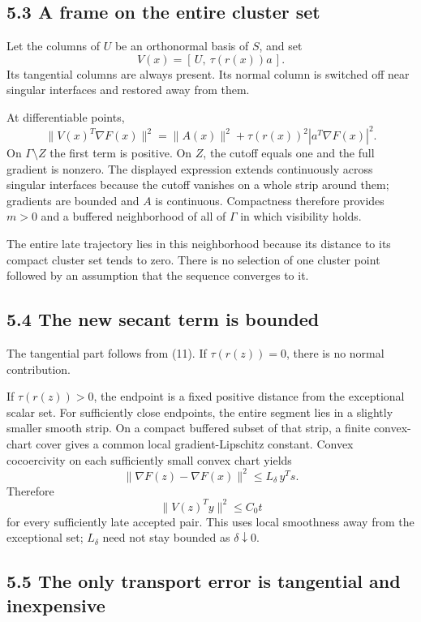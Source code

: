 \documentclass[10pt,oneside,openany]{book}
\theoremstyle{remark}\newtheorem{remark}{Remark}[chapter]
\begin{document}
\subsection{5.3 A frame on the entire cluster
set}\label{U:a-frame-on-the-entire-cluster-set}

Let the columns of \(U\) be an orthonormal basis of \(S\), and set \[
 \boxed{V(x)=[\,U,\ \tau(r(x))a\,].}\tag{U.12}
\] Its tangential columns are always present. Its normal column is
switched off near singular interfaces and restored away from them.

At differentiable points, \[
 \|V(x)^T\nabla F(x)\|^2
 =\|A(x)\|^2+\tau(r(x))^2|a^T\nabla F(x)|^2.
\] On \(\Gamma\setminus Z\) the first term is positive. On \(Z\), the
cutoff equals one and the full gradient is nonzero. The displayed
expression extends continuously across singular interfaces because the
cutoff vanishes on a whole strip around them; gradients are bounded and
\(A\) is continuous. Compactness therefore provides \(m>0\) and a
buffered neighborhood of all of \(\Gamma\) in which visibility holds.

The entire late trajectory lies in this neighborhood because its
distance to its compact cluster set tends to zero. There is no selection
of one cluster point followed by an assumption that the sequence
converges to it.

\subsection{5.4 The new secant term is
bounded}\label{U:the-new-secant-term-is-bounded}

The tangential part follows from (11). If \(\tau(r(z))=0\), there is no
normal contribution.

If \(\tau(r(z))>0\), the endpoint is a fixed positive distance from the
exceptional scalar set. For sufficiently close endpoints, the entire
segment lies in a slightly smaller smooth strip. On a compact buffered
subset of that strip, a finite convex-chart cover gives a common local
gradient-Lipschitz constant. Convex cocoercivity on each sufficiently
small convex chart yields \[
 \|\nabla F(z)-\nabla F(x)\|^2\le L_\delta\,y^Ts.
\] Therefore \[
 \|V(z)^Ty\|^2\le C_0t\tag{U.13}
\] for every sufficiently late accepted pair. This uses local smoothness
away from the exceptional set; \(L_\delta\) need not stay bounded as
\(\delta\downarrow0\).

\subsection{5.5 The only transport error is tangential and
inexpensive}\label{U:the-only-transport-error-is-tangential-and-inexpensive}
\end{document}
